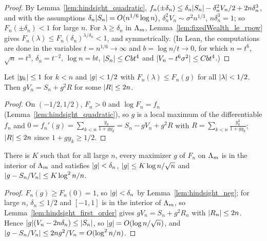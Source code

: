 \begin{proof}
  \leanok
  By Lemma~\ref{lem:hindsight_quadratic},
  $f_n(\pm\delta_n) \le \delta_n \lvert S_n \rvert - \delta_n^2 V_n/2 + 2 n\delta_n^3$, and with the
  assumptions $\delta_n\lvert S_n \rvert = O(n^{1/6}\log n)$, $\delta_n^2 V_n \sim \sigma^2 n^{1/3}$, $n
  \delta_n^3 = 1$; so $F_n(\pm\delta_n) < 1$ for large $n$. For $\lambda \ge \delta_n$ in $\Lambda_m$,
  Lemma~\ref{lem:fixedWealth_le_rpow} gives $F_n(\lambda) \le F_n(\delta_n)^{\lambda/\delta_n} < 1$,
  and symmetrically. (In Lean, the computations are done in the variables $t = n^{1/6} \to \infty$
  and $b = \log n / t \to 0$, for which $n = t^6$, $\sqrt n = t^3$, $\delta_n = t^{-2}$,
  $\log n = bt$, $\lvert S_n \rvert \le C b t^4$ and $\lvert V_n - t^6 \sigma^2 \rvert \le C b t^4$.)
\end{proof}

\begin{lemma}
  \label{lem:hindsight_first_order}
  \leanok
  Let $\lvert y_k \rvert \le 1$ for $k < n$ and $\lvert g \rvert < 1/2$ with $F_n(\lambda) \le F_n(g)$ for all
  $\lvert \lambda \rvert < 1/2$. Then $g V_n = S_n + g^2 R$ for some $\lvert R \rvert \le 2n$.
\end{lemma}

\begin{proof}
  \leanok
  On $(-1/2, 1/2)$, $F_n > 0$ and $\log F_n = f_n$ (Lemma~\ref{lem:hindsight_quadratic}), so $g$
  is a local maximum of the differentiable $f_n$ and
  $0 = f_n'(g) = \sum_{k<n} \frac{y_k}{1 + g y_k} = S_n - g V_n + g^2 R$ with
  $R = \sum_{k<n} \frac{y_k^3}{1 + gy_k}$; $\lvert R \rvert \le 2n$ since $1 + g y_k \ge 1/2$.
\end{proof}

\begin{lemma}
  \label{lem:grapa_location}
  \leanok
  There is $K$ such that for all large $n$, every maximizer $g$ of $F_n$ on $\Lambda_m$ is in the
  interior of $\Lambda_m$ and satisfies $\lvert g \rvert < \delta_n$, $\lvert g \rvert \le K \log n / \sqrt n$ and
  $\lvert g - S_n/V_n \rvert \le K \log^2 n / n$.
\end{lemma}

\begin{proof}
  \leanok
  $F_n(g) \ge F_n(0) = 1$, so $\lvert g \rvert < \delta_n$ by Lemma~\ref{lem:hindsight_neg}; for large $n$,
  $\delta_n \le 1/2$ and $[-1, 1]$ is in the interior of $\Lambda_m$, so
  Lemma~\ref{lem:hindsight_first_order} gives $g V_n = S_n + g^2 R_n$ with $\lvert R_n \rvert \le 2n$.
  Hence $\lvert g \rvert (V_n - 2n\delta_n) \le \lvert S_n \rvert$, so $\lvert g \rvert = O(\log n/\sqrt n)$, and
  $\lvert g - S_n/V_n \rvert \le 2n g^2/V_n = O(\log^2 n / n)$.
\end{proof}

